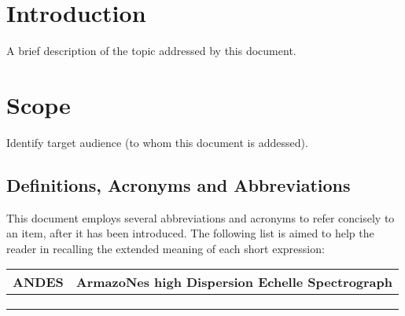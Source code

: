 \section{Introduction}
\label{sec:intro}

A brief description of the topic addressed by this document.


\section{Scope}
\label{sec:scope}

Identify target audience (to whom this document is addessed).


\subsection{Definitions, Acronyms and Abbreviations}
\label{sec:acronyms}

This document employs several abbreviations and acronyms to refer concisely to an item, after it has been introduced. The following list is aimed to help the reader in recalling the extended meaning of each short expression:

\begin{longtable}{ |l|l| }
  \hline
ANDES & ArmazoNes high Dispersion Echelle Spectrograph \\ \hline
      &                                                \\ \hline
      &                                                \\ \hline
      &                                                \\ \hline
\end{longtable}
